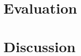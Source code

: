 \documentclass{fithesis}
\begin{document}
\chapter{Evaluation}


\chapter{Discussion}

\end{document}
